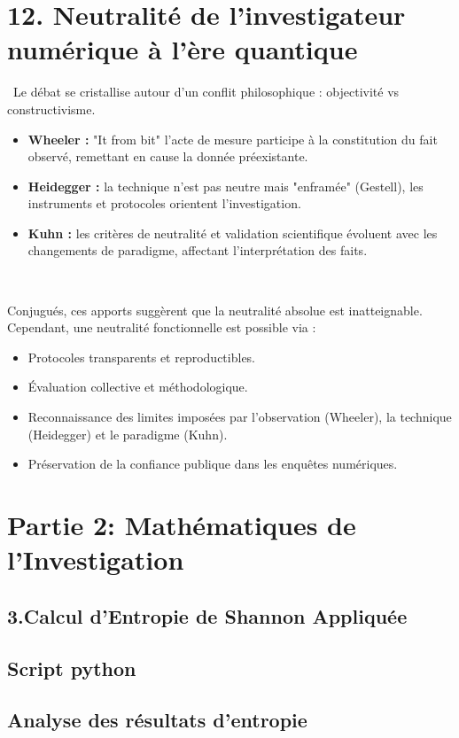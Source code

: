 \documentclass[12pt,a4paper]{report}
\begin{document}
{	
	\section*{12. Neutralité de l’investigateur numérique à l’ère quantique}\
	Le débat se cristallise autour d’un conflit philosophique : objectivité vs constructivisme.
	
	
	\begin{itemize}
		\item \textbf{Wheeler :} "It from bit"  l’acte de mesure participe à la constitution du fait observé, remettant en cause la donnée préexistante.
		\item \textbf{Heidegger :} la technique n’est pas neutre mais "enframée" (Gestell), les instruments et protocoles orientent l’investigation.
		\item \textbf{Kuhn :} les critères de neutralité et validation scientifique évoluent avec les changements de paradigme, affectant l’interprétation des faits.
	\end{itemize}\
	
	
	Conjugués, ces apports suggèrent que la neutralité absolue est inatteignable. Cependant, une neutralité fonctionnelle est possible via :
	\begin{itemize}
		\item Protocoles transparents et reproductibles.
		\item Évaluation collective et méthodologique.
		\item Reconnaissance des limites imposées par l’observation (Wheeler), la technique (Heidegger) et le paradigme (Kuhn).
		\item Préservation de la confiance publique dans les enquêtes numériques.
	\end{itemize}
	\section*{Partie 2: Mathématiques de l’Investigation}
	
		\subsection*{3.Calcul d’Entropie de Shannon Appliquée}
		\subsection*{Script python}
		\subsection*{ Analyse des résultats d’entropie}
		
}
\end{document}
